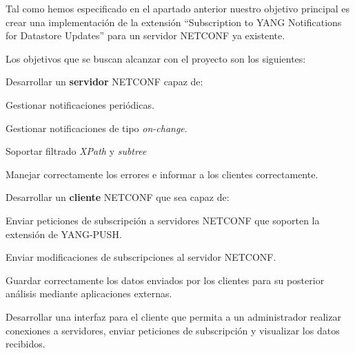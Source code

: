 Tal como hemos especificado en el apartado anterior nuestro objetivo principal es crear una implementación de la extensión ``Subscription to YANG Notifications for Datastore Updates'' para un servidor \ac{NETCONF} ya existente.

Los objetivos que se buscan alcanzar con el proyecto son los siguientes:

\begin{objetive}
    \item Desarrollar un \textbf{servidor} NETCONF capaz de:
        \begin{objetive}
            \item Gestionar notificaciones periódicas.
            \item Gestionar notificaciones de tipo \textit{on-change}.
            \item Soportar filtrado \textit{XPath} y \textit{subtree}
            \item Manejar correctamente los errores e informar a los clientes correctamente.
        \end{objetive}    
    
    \item Desarrollar un \textbf{cliente} \ac{NETCONF} que sea capaz de:
        \begin{objetive}
            \item Enviar peticiones de subscripción a servidores \ac{NETCONF} que soporten la extensión de YANG-PUSH.
            \item Enviar modificaciones de subscripciones al servidor \ac{NETCONF}.
            \item Guardar correctamente los datos enviados por los clientes para su posterior análisis mediante aplicaciones externas.
        \end{objetive}    
    \item Desarrollar una interfaz para el cliente que permita a un administrador realizar conexiones a servidores, enviar peticiones de subscripción y visualizar los datos recibidos.
\end{objetive}



